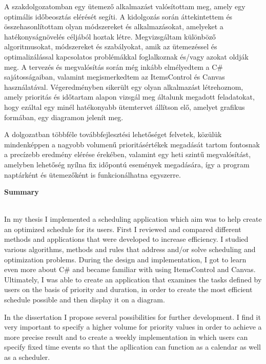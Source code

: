
A szakdolgozatomban egy ütemező alkalmazást valósítottam meg, amely egy optimális időbeosztás elérését segíti. A kidolgozás során áttekintettem és összehasonlítottam olyan módszereket és alkalmazásokat, amelyeket a hatékonyságnövelés céljából hoztak létre. Megvizsgáltam különböző algoritmusokat, módszereket és szabályokat, amik az ütemezéssel és optimalizálással kapcsolatos problémákkal foglalkoznak és/vagy azokat oldják meg. A tervezés és megvalósítás során még inkább elmélyedtem a C\# sajátosságaiban, valamint megismerkedtem az ItemsControl és Canvas használatával. Végeredményben sikerült egy olyan alkalmazást létrehoznom, amely prioritás és időtartam alapon vizsgál meg általunk megadott feladatokat, hogy ezáltal egy minél hatékonyabb ütemtervet állítson elő, amelyet grafikus formában, egy diagramon jelenít meg.

A dolgozatban többféle továbbfejlesztési lehetőséget felvetek, közülük mindenképpen a nagyobb volumenű prioritásértékek megadását tartom fontosnak a precízebb eredmény elérése érekében, valamint egy heti szintű megvalósítást, amelyben lehetőség nyílna fix időpontú események megadására, így a program naptárként és ütemezőként is funkcionálhatna egyszerre.

\newpage
\begin{LARGE}
\textbf{Summary}
\end{LARGE}
\\

In my thesis I implemented a scheduling application which aim was to help create an optimized schedule for its users. First I reviewed and compared different methods and applications that were developed to increase efficiency. I studied various algorithms, methods and rules that address and/or solve scheduling and optimization problems. During the design and implementation, I got to learn even more about C\# and became familiar with using ItemsControl and Canvas. Ultimately, I was able to create an application that examines the tasks defined by users on the basis of priority and duration, in order to create the most efficient schedule possible and then display it on a diagram.

In the dissertation I propose several possibilities for further development. I find it very important to specify a higher volume for priority values in order to achieve a more precise result and to create a weekly implementation in which users can specify fixed time events so that the apllication can function as a calendar as well as a scheduler.
